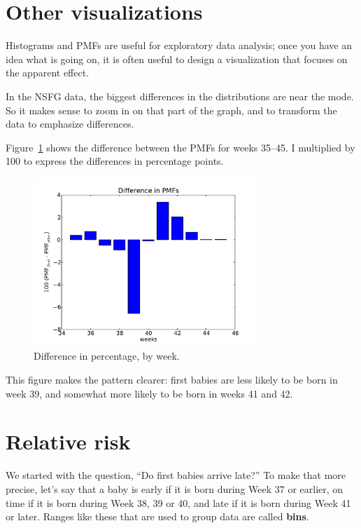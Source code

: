 \documentclass[12pt]{book}
\begin{document}
\section{Other visualizations}

Histograms and PMFs are useful for exploratory data analysis;
once you have an idea what is going on, it is often useful to
design a visualization that focuses on the apparent effect.

In the NSFG data, the biggest differences in the distributions are
near the mode.  So it makes sense to zoom in on that part of the
graph, and to transform the data to emphasize differences.

Figure~\ref{nsfg_diffs} shows the difference between the PMFs for weeks
35--45.  I multiplied by 100 to express the differences in percentage
points.

\begin{figure}
\centerline{\includegraphics[height=2.5in]{figs/nsfg_diffs.pdf}}
\caption{Difference in percentage, by week.}
\label{nsfg_diffs}
\end{figure}

This figure makes the pattern clearer: first babies are
less likely to be born in week 39, and somewhat more likely
to be born in weeks 41 and 42.


\section{Relative risk}
\label{relative.risk}

We started with the question, ``Do first babies arrive late?''  To
make that more precise, let's say that a baby is early if it is born
during Week 37 or earlier, on time if it is born during Week 38, 39 or
40, and late if it is born during Week 41 or later.  Ranges like these
that are used to group data are called {\bf bins}.
\end{document}
